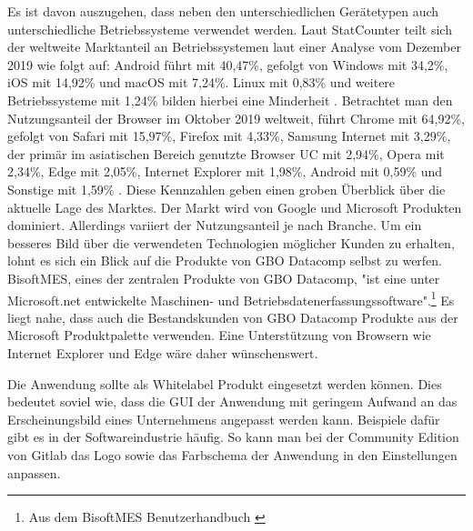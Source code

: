 Es ist davon auszugehen, dass neben den unterschiedlichen Gerätetypen auch unterschiedliche
Betriebssysteme verwendet werden. Laut StatCounter teilt sich der weltweite Marktanteil
an Betriebssystemen laut einer Analyse vom Dezember 2019 wie folgt auf: Android führt mit
40,47\%, gefolgt von Windows mit 34,2\%, iOS mit 14,92\% und macOS mit 7,24\%. Linux mit 0,83\% und weitere
Betriebssysteme mit 1,24\% bilden hierbei eine Minderheit \cite{StatCounterOSMarketShare}. Betrachtet man den
Nutzungsanteil der Browser im Oktober 2019 weltweit, führt Chrome mit 64,92\%, gefolgt von Safari mit 15,97\%,
Firefox mit 4,33\%, Samsung Internet mit 3,29\%, der primär im asiatischen Bereich genutzte Browser UC
mit 2,94\%, Opera mit 2,34\%, Edge mit 2,05\%, Internet Explorer mit 1,98\%, Android mit 0,59\% und Sonstige mit 1,59\% \cite{StatCounterBrowserMarketShare}.
Diese Kennzahlen geben einen groben Überblick über die aktuelle Lage des Marktes. Der Markt wird von
Google und Microsoft Produkten dominiert. Allerdings variiert der Nutzungsanteil je nach Branche.
Um ein besseres Bild über die verwendeten Technologien möglicher Kunden zu erhalten,
lohnt es sich ein Blick auf die Produkte von GBO Datacomp selbst zu werfen.
BisoftMES, eines der zentralen Produkte von GBO Datacomp, "ist eine unter Microsoft.net
entwickelte Maschinen- und Betriebsdatenerfassungssoftware".\footnote{Aus dem BisoftMES Benutzerhandbuch \cite[S. 7]{BisoftMESHandbuch}}
Es liegt nahe, dass auch die Bestandskunden von GBO Datacomp Produkte aus der Microsoft
Produktpalette verwenden. Eine Unterstützung von Browsern wie Internet Explorer und Edge
wäre daher wünschenswert.

Die Anwendung sollte als Whitelabel Produkt eingesetzt werden können. Dies bedeutet soviel wie,
dass die GUI der Anwendung mit geringem Aufwand an das Erscheinungsbild eines Unternehmens angepasst
werden kann. Beispiele dafür gibt es in der Softwareindustrie häufig. So kann man bei
der Community Edition von Gitlab das Logo sowie das Farbschema der Anwendung in den Einstellungen
anpassen.\cite{GitlabDocs}

